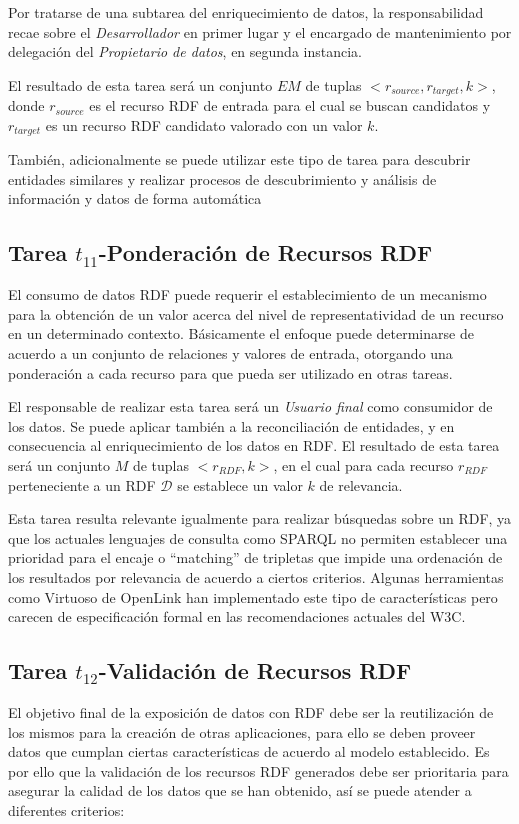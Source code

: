 Por tratarse de una subtarea del enriquecimiento de datos, la responsabilidad recae sobre el \textit{Desarrollador} 
en primer lugar y el encargado de mantenimiento por delegación del \textit{Propietario de datos}, en segunda instancia. 

El resultado de esta tarea será un conjunto $EM$ de tuplas $<r_{source}, r_{target}, k>$, donde $r_{source}$ es el 
recurso RDF de entrada para el cual se buscan candidatos y $r_{target}$ es un recurso RDF candidato valorado con un valor $k$.

También, adicionalmente se puede utilizar este tipo de tarea para descubrir entidades similares
y realizar procesos de descubrimiento y análisis de información y datos de forma automática

\subsection{Tarea $t_{11}$-Ponderación de Recursos RDF}
El consumo de datos \gls{RDF} puede requerir el establecimiento de un mecanismo para la obtención de 
un valor acerca del nivel de representatividad de un recurso en un determinado contexto. Básicamente
el enfoque puede determinarse de acuerdo a un conjunto de relaciones y valores de entrada, otorgando 
una ponderación a cada recurso para que pueda ser utilizado en otras tareas.

El responsable de realizar esta tarea será un \textit{Usuario final} como consumidor
de los datos. Se puede aplicar también a la reconciliación de entidades, y en consecuencia 
al enriquecimiento de los datos en RDF. El resultado de esta tarea será un conjunto $M$ de tuplas $<r_{RDF}, k>$, en el 
cual para cada recurso $r_{RDF}$ perteneciente a un \dataset RDF $\mathcal{D}$ se establece un valor $k$ de relevancia.

Esta tarea resulta relevante igualmente para realizar búsquedas sobre un \dataset RDF, ya que
los actuales lenguajes de consulta como \gls{SPARQL} no permiten establecer una prioridad para
el encaje o ``matching'' de tripletas que impide una ordenación de los resultados por relevancia de acuerdo
a ciertos criterios. Algunas herramientas como Virtuoso de OpenLink han implementado este tipo de características
pero carecen de especificación formal en las recomendaciones actuales del W3C.

\subsection{Tarea $t_{12}$-Validación de Recursos RDF}\label{lod-t12}
El objetivo final de la exposición de datos con \gls{RDF} debe ser la reutilización de los mismos
para la creación de otras aplicaciones, para ello se deben proveer datos que cumplan ciertas características de acuerdo al modelo establecido. Es por ello
que la validación de los recursos RDF generados debe ser prioritaria para asegurar
la calidad de los datos que se han obtenido, así se puede atender a diferentes criterios:

